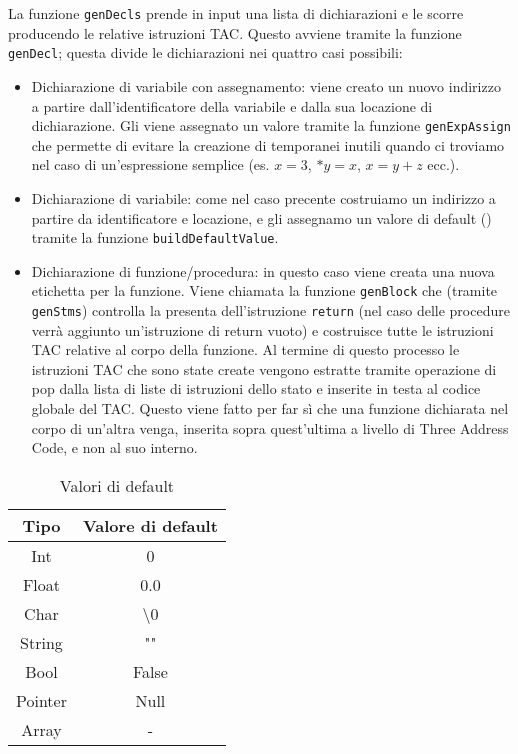 La funzione {\tt genDecls} prende in input una lista di dichiarazioni e le scorre producendo le relative istruzioni TAC. Questo avviene tramite la funzione {\tt genDecl}; questa divide le dichiarazioni nei quattro casi possibili:
\begin{itemize}
    \item Dichiarazione di variabile con assegnamento: viene creato un nuovo indirizzo a partire dall'identificatore della variabile e dalla sua locazione di dichiarazione. Gli viene assegnato un valore tramite la funzione {\tt genExpAssign} che permette di evitare la creazione di temporanei inutili quando ci troviamo nel caso di un'espressione semplice (es. $x = 3$, $*y= x$, $x = y + z$ ecc.).
    \item Dichiarazione di variabile: come nel caso precente costruiamo un indirizzo a partire da identificatore e locazione, e gli assegnamo un valore di default (\label{table:valori_default}) tramite la funzione {\tt buildDefaultValue}.
    \item Dichiarazione di funzione/procedura: in questo caso viene creata una nuova etichetta per la funzione. Viene chiamata la funzione {\tt genBlock} che (tramite {\tt genStms}) controlla la presenta dell'istruzione {\tt return} (nel caso delle procedure verrà aggiunto un'istruzione di return vuoto) e costruisce tutte le istruzioni TAC relative al corpo della funzione. Al termine di questo processo le istruzioni TAC che sono state create vengono estratte tramite operazione di pop dalla lista di liste di istruzioni dello stato e inserite in testa al codice globale del TAC. Questo viene fatto per far sì che una funzione dichiarata nel corpo di un'altra venga, inserita sopra quest'ultima a livello di Three Address Code, e non al suo interno.
\end{itemize}

\begin{table}
\centering
    \begin{tabular}{|c c|} 
        \hline
        Tipo & Valore di default \\ [0.5ex] 
        \hline\hline
        Int & 0 \\ 
        Float & 0.0  \\
        Char & \textbackslash0 \\
        String &  "" \\
        Bool & False \\ 
        Pointer & Null\\
        Array & - \\[1ex] 
        \hline
    \end{tabular}
    \caption{Valori di default}
    \label{table:valori_default}
\end{table}


